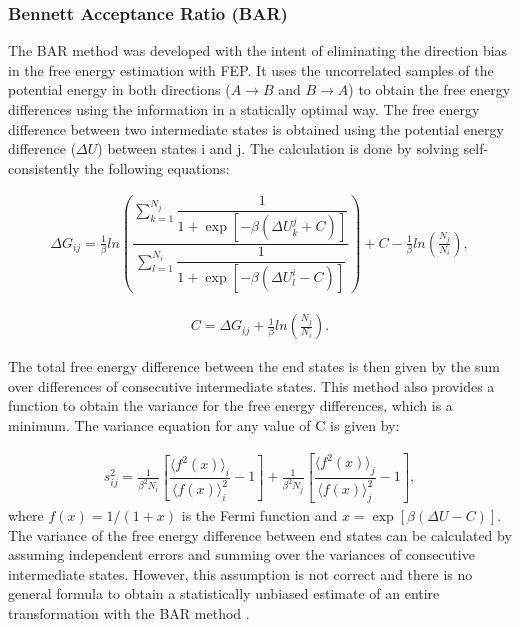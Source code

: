 \subsubsection{Bennett Acceptance Ratio (BAR)}

The BAR method \cite{bennet1976} was developed with the intent of eliminating the direction bias in the free energy estimation with FEP. It uses the uncorrelated samples of the potential energy in both directions ($A \rightarrow B$ and $B \rightarrow A$) to obtain the free energy differences using the information in a statically optimal way. The free energy difference between two intermediate states is obtained using the potential energy difference ($\Delta U$) between states i and j. The calculation is done by solving self-consistently the following equations: 

\begin{equation}
\label{eq:bar1}
\begin{aligned}
\Delta G_{ij} = \frac{1}{\beta} ln \left( \dfrac{\sum_{k=1}^{N_{j}} \dfrac{1}{1+\exp[-\beta(\Delta U_{k}^{j}+C)]}}{\sum_{l=1}^{N_{i}} \dfrac{1}{1+\exp[-\beta(\Delta U_{l}^{i}-C)]}}\right) + C - \frac{1}{\beta}ln\left(\frac{N_{j}}{N_{i}}\right),
\end{aligned}
\end{equation}

\begin{equation}
\label{eq:bar2}
\begin{aligned}
C = \Delta G_{ij} + \frac{1}{\beta}ln\left(\frac{N_{j}}{N_{i}}\right).
\end{aligned}
\end{equation}

The total free energy difference between the end states is then given by the sum over differences of consecutive intermediate states. This method also provides a function to obtain the variance for the free energy differences, which is a minimum. The variance equation for any value of C is given by:

\begin{equation}
\label{eq:barvar}
\begin{aligned}
s_{ij}^{2} = \frac{1}{\beta^{2} N_{i}} \left[\dfrac{\langle{f^{2}(x)}\rangle_{i}}{\langle{f(x)}\rangle^{2}_{i}} - 1\right] + \frac{1}{\beta^{2} N_{j}} \left[\dfrac{\langle{f^{2}(x)}\rangle_{j}}{\langle{f(x)}\rangle^{2}_{j}} - 1\right],
\end{aligned}
\end{equation}
where $f(x)=1/(1+x)$ is the Fermi function and $x=\exp[\beta(\Delta U - C)]$. The variance of the free energy difference between end states can be calculated by assuming independent errors and summing over the variances of consecutive intermediate states. However, this assumption is not correct and there is no general formula to obtain a statistically unbiased estimate of an entire transformation with the BAR method \cite{bareva}. 

